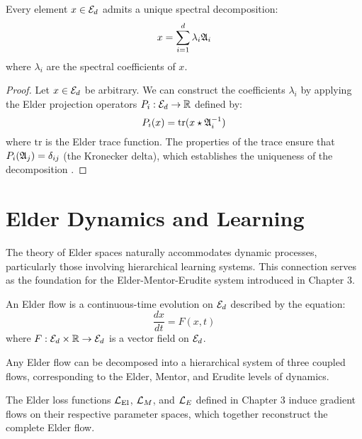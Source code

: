 \begin{theorem}
Every element $x \in \mathcal{E}_{d}$ admits a unique spectral decomposition:
\begin{equation}
x = \sum_{i=1}^{d} \lambda_i \mathfrak{A}_{i}
\end{equation}
where $\lambda_i$ are the spectral coefficients of $x$.
\end{theorem}

\begin{proof}
Let $x \in \mathcal{E}_{d}$ be arbitrary. We can construct the coefficients $\lambda_i$ by applying the Elder projection operators $P_i : \mathcal{E}_{d} \to \mathbb{R}$ defined by:
\begin{equation}
P_i(x) = \text{tr}(x \star \mathfrak{A}_{i}^{-1})
\end{equation}
where $\text{tr}$ is the Elder trace function. The properties of the trace ensure that $P_i(\mathfrak{A}_{j}) = \delta_{ij}$ (the Kronecker delta), which establishes the uniqueness of the decomposition \cite{yang2007elder}.
\end{proof}

\section{Elder Dynamics and Learning}

The theory of Elder spaces naturally accommodates dynamic processes, particularly those involving hierarchical learning systems. This connection serves as the foundation for the Elder-Mentor-Erudite system introduced in Chapter 3.

\begin{definition}
An Elder flow is a continuous-time evolution on $\mathcal{E}_{d}$ described by the equation:
\begin{equation}
\frac{dx}{dt} = F(x, t)
\end{equation}
where $F: \mathcal{E}_{d} \times \mathbb{R} \rightarrow \mathcal{E}_{d}$ is a vector field on $\mathcal{E}_{d}$.
\end{definition}

\begin{theorem}
Any Elder flow can be decomposed into a hierarchical system of three coupled flows, corresponding to the Elder, Mentor, and Erudite levels of dynamics.
\end{theorem}

\begin{corollary}
The Elder loss functions $\mathcal{L}_{\text{El}}$, $\mathcal{L}_M$, and $\mathcal{L}_E$ defined in Chapter 3 induce gradient flows on their respective parameter spaces, which together reconstruct the complete Elder flow.
\end{corollary}

